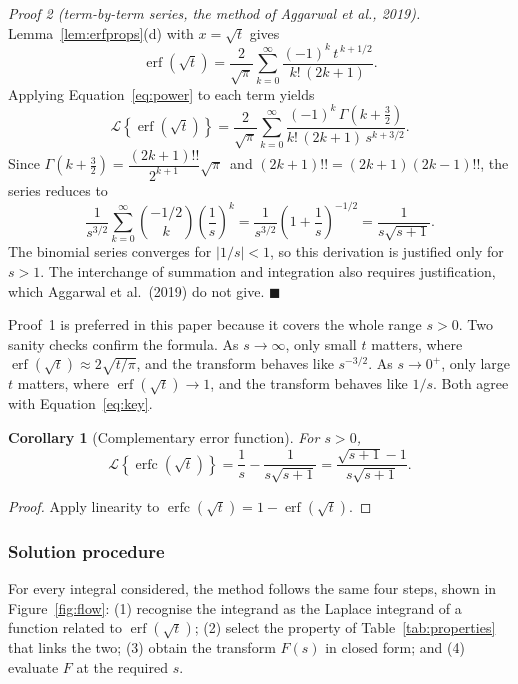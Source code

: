 \documentclass[12pt,a4paper]{article}
\theoremstyle{definition}
\theoremstyle{plain}
\newtheorem{corollary}[theorem]{Corollary}
\theoremstyle{remark}
\newcommand{\erf}{\operatorname{erf}}
\newcommand{\erfc}{\operatorname{erfc}}
\newcommand{\Lap}[1]{\mathcal{L}\!\left\{#1\right\}}
\begin{document}
	\textit{Proof 2 (term-by-term series, the method of Aggarwal et al., 2019).} Lemma~\ref{lem:erfprops}(d) with $x=\sqrt{t}$ gives
	\[
	\erf(\sqrt{t})=\frac{2}{\sqrt{\pi}}\sum_{k=0}^{\infty}\frac{(-1)^k\,t^{\,k+1/2}}{k!\,(2k+1)} .
	\]
	Applying Equation~\eqref{eq:power} to each term yields
	\[
	\Lap{\erf(\sqrt{t})}=\frac{2}{\sqrt{\pi}}\sum_{k=0}^{\infty}\frac{(-1)^k\,\Gamma(k+\tfrac32)}{k!\,(2k+1)\,s^{k+3/2}} .
	\]
	Since $\Gamma(k+\tfrac32)=\dfrac{(2k+1)!!}{2^{k+1}}\sqrt{\pi}\,$ and $(2k+1)!!=(2k+1)(2k-1)!!$, the series reduces to
	\[
	\frac{1}{s^{3/2}}\sum_{k=0}^{\infty}\binom{-1/2}{k}\left(\frac{1}{s}\right)^{k}
	=\frac{1}{s^{3/2}}\left(1+\frac{1}{s}\right)^{-1/2}=\frac{1}{s\sqrt{s+1}} .
	\]
	The binomial series converges for $|1/s|<1$, so this derivation is justified only for $s>1$. The interchange of summation and integration also requires justification, which Aggarwal et al.\ (2019) do not give. \hfill$\blacksquare$
	
	Proof~1 is preferred in this paper because it covers the whole range $s>0$. Two sanity checks confirm the formula. As $s\to\infty$, only small $t$ matters, where $\erf(\sqrt{t})\approx 2\sqrt{t/\pi}$, and the transform behaves like $s^{-3/2}$. As $s\to 0^{+}$, only large $t$ matters, where $\erf(\sqrt{t})\to 1$, and the transform behaves like $1/s$. Both agree with Equation~\eqref{eq:key}.
	
	\begin{corollary}[Complementary error function]\label{cor:erfc}
		For $s>0$,
		\[
		\Lap{\erfc(\sqrt{t})}=\frac{1}{s}-\frac{1}{s\sqrt{s+1}}=\frac{\sqrt{s+1}-1}{s\sqrt{s+1}} .
		\]
	\end{corollary}
	
	\begin{proof}
		Apply linearity to $\erfc(\sqrt{t})=1-\erf(\sqrt{t})$.
	\end{proof}
	
	\subsubsection{Solution procedure}
	
	For every integral considered, the method follows the same four steps, shown in Figure~\ref{fig:flow}: (1) recognise the integrand as the Laplace integrand of a function related to $\erf(\sqrt{t})$; (2) select the property of Table~\ref{tab:properties} that links the two; (3) obtain the transform $F(s)$ in closed form; and (4) evaluate $F$ at the required $s$.
	
\end{document}
